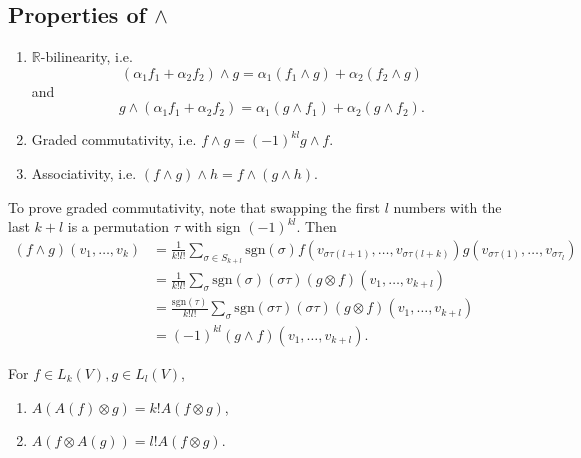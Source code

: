\subsection{Properties of $\wedge$}
\begin{enumerate}
  \item{
    $\mathbb{R}$-bilinearity, i.e.
    $$
      (\alpha_1 f_1 + \alpha_2 f_2)  \wedge g
    = \alpha_1 (f_1 \wedge g) + \alpha_2 (f_2 \wedge g)
    $$
    and
    $$
      g \wedge (\alpha_1 f_1 + \alpha_2 f_2)
    = \alpha_1 (g \wedge f_1) + \alpha_2 (g \wedge f_2).
    $$
  }
  \item{
    Graded commutativity, i.e.
    $f \wedge g = (-1)^{kl} g \wedge f$.
  }
  \item{
    Associativity, i.e.
    $(f \wedge g) \wedge h = f \wedge (g \wedge h)$.
  }
\end{enumerate}

To prove graded commutativity, note that swapping the first $l$
numbers with the last $k + l$ is a permutation $\tau$ with sign
$(-1)^{kl}$. Then
\begin{align*}
   (f \wedge g)(v_1, \dots, v_k)
&= \frac{1}{k! l!}
   \sum_{\sigma \in S_{k + l}}
     \mathrm{sgn}(\sigma)
     f(v_{\sigma \tau(l + 1)}, \dots, v_{\sigma \tau(l + k)})
     g(v_{\sigma \tau (1)}, \dots, v_{\sigma \tau_{l}}) \\
&= \frac{1}{k! l!}
   \sum_{\sigma}
     \mathrm{sgn}(\sigma)
     (\sigma \tau)
       (g \otimes f)
         (v_{1}, \dots, v_{k + l}) \\
&= \frac{\mathrm{sgn}(\tau)}
        {k! l!}
   \sum_\sigma
     \mathrm{sgn}(\sigma \tau)
     (\sigma \tau)
       (g \otimes f)
         (v_1, \dots, v_{k+l}) \\
&= (-1)^{kl} (g \wedge f) (v_1, \dots, v_{k+l}).
\end{align*}

\begin{lemma}
For $f \in L_k(V), g \in L_l(V)$,
\begin{enumerate}
  \item{
    $A(A(f) \otimes g) = k! A(f \otimes g)$,
  }
  \item{
    $A(f \otimes A(g)) = l! A(f \otimes g)$.
  }
\end{enumerate}
\end{lemma}

